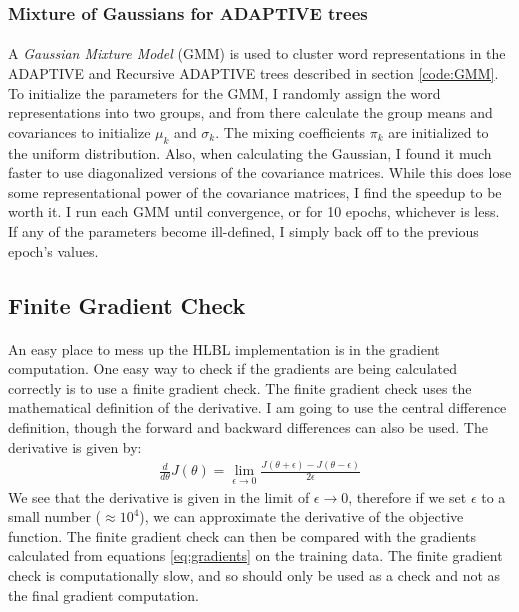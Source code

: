 \subsubsection{Mixture of Gaussians for ADAPTIVE trees}
\paragraph{}
A \emph{Gaussian Mixture Model} (GMM) is used to cluster word representations in the ADAPTIVE and Recursive ADAPTIVE trees described in section \ref{code:GMM}. To initialize the parameters for the GMM, I randomly assign the word representations into two groups, and from there calculate the group means and covariances to initialize $\mu_k$ and $\sigma_k$. The mixing coefficients $\pi_k$ are initialized to the uniform distribution. Also, when calculating the Gaussian, I found it much faster to use diagonalized versions of the covariance matrices. While this does lose some representational power of the covariance matrices, I find the speedup to be worth it. I run each GMM until convergence, or for 10 epochs, whichever is less. If any of the parameters become ill-defined, I simply back off to the previous epoch's values. 

\subsection{Finite Gradient Check}
\paragraph{}
An easy place to mess up the HLBL implementation is in the gradient computation. One easy way to check if the gradients are being calculated correctly is to use a finite gradient check. The finite gradient check uses the mathematical definition of the derivative. I am going to use the central difference definition, though the forward and backward differences can also be used. The derivative is given by:
\begin{align}
\frac{d}{d\theta} J(\theta) = \lim_{\epsilon \to 0} \frac{ J({\theta + \epsilon} )- J({\theta - \epsilon}) } {2 \epsilon}
\end{align}
We see that the derivative is given in the limit of $\epsilon \to 0$, therefore if we set $\epsilon$ to a small number ($\approx10^4$), we can approximate the derivative of the objective function. The finite gradient check can then be compared with the gradients calculated from equations \ref{eq:gradients} on the training data. The finite gradient check is computationally slow, and so should only be used as a check and not as the final gradient computation.

